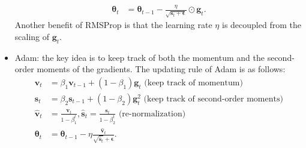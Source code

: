 \begin{itemize}
\begin{equation}
\begin{aligned}
                        \bm{\theta}_t & = \bm{\theta}_{t-1} - \frac{\eta}{\sqrt{\bm{s}_t + \bm{\epsilon}}} \odot \bm{g}_t.
                    \end{aligned}
                \end{equation}
            Another benefit of RMSProp is that the learning rate $\eta$ is decoupled from the scaling of $\bm{g}_t$.
            \item Adam: the key idea is to keep track of both the momentum and the second-order moments of the gradients.
            The updating rule of Adam is as follows:
                \begin{equation}
                    \begin{aligned}
                        \bm{v}_t & = \beta_1 \bm{v}_{t-1} + (1 - \beta_1) \bm{g}_{t} \text{ (keep track of momentum)} \\
                        \bm{s}_t & = \beta_2 \bm{s}_{t-1} + (1-\beta_2) \bm{g}_t^2 \text{ (keep track of second-order moments)} \\
                        \hat{\bm{v}}_t & = \frac{\bm{v}_t}{1 - \beta_1^t}, \hat{\bm{s}}_t = \frac{\bm{s}_t}{1 - \beta_2^t} \text{ (re-normalization)} \\
                        \bm{\theta}_t & = \bm{\theta}_{t-1}  - \eta \frac{\hat{\bm{v}}_t}{\sqrt{\hat{\bm{s}}_t} +\bm{\epsilon}}.
                    \end{aligned}
                \end{equation}
        \end{itemize}
        
    


